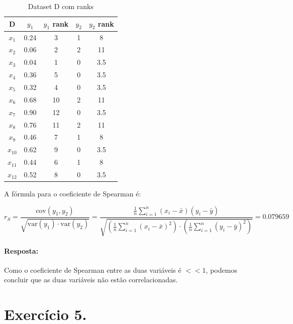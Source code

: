 \documentclass{article}
\begin{document}
\begin{table}[h!]
\centering
\begin{tabular}{|c|c|c|c|c|}
\hline
D      & $y_1$ & $y_1$ rank & $y_2$ & $y_2$ rank \\ \hline
$x_1$  & 0.24  & 3          & 1     & 8          \\ \hline
$x_2$  & 0.06  & 2          & 2     & 11          \\ \hline
$x_3$  & 0.04  & 1          & 0     & 3.5         \\ \hline
$x_4$  & 0.36  & 5          & 0     & 3.5          \\ \hline
$x_5$  & 0.32  & 4          & 0     & 3.5          \\ \hline
$x_6$  & 0.68  & 10          & 2     & 11          \\ \hline
$x_7$  & 0.90  & 12          & 0     & 3.5          \\ \hline
$x_8$  & 0.76  & 11          & 2     & 11          \\ \hline
$x_9$  & 0.46  & 7          & 1     & 8         \\ \hline
$x_{10}$ & 0.62  & 9          & 0     & 3.5          \\ \hline
$x_{11}$ & 0.44  & 6          & 1     & 8          \\ \hline
$x_{12}$ & 0.52  & 8          & 0     & 3.5          \\ \hline
\end{tabular}
\caption{Dataset D com ranks}
\label{tab:datasetD_ranks}
\end{table}

A fórmula para o coeficiente de Spearman é:

\[ r_S = \frac{\text{cov}(y_1, y_2)}{\sqrt{\text{var}(y_1)\cdot \text{var}(y_2)}} = \frac{\frac{1}{n} \sum_{i=1}^{n} (x_i - \bar{x})(y_i - \bar{y})}{ \sqrt{\left(\frac{1}{n} \sum_{i=1}^{n} (x_i - \bar{x})^2 \right) \cdot \left(\frac{1}{n} \sum_{i=1}^{n} (y_i - \bar{y})^2 \right)}} = 0.079659 \]

\paragraph{Resposta: }Como o coeficiente de Spearman entre as duas variáveis é $<< 1$, podemos concluir que as duas variáveis não estão correlacionadas.

\section{Exercício 5.}
\end{document}
